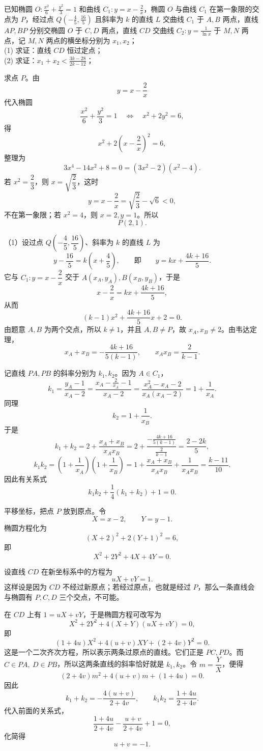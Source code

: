\begin{example}
已知椭圆 $O: \frac{x^2}{6} + \frac{y^2}{3} = 1$ 和曲线 $C_1: y = x - \frac{2}{x}$，椭圆 $O$ 与曲线 $C_1$ 在第一象限的交点为 $P$，经过点 $Q\left(-\frac{4}{5}, \frac{16}{5}\right)$ 且斜率为 $k$ 的直线 $L$ 交曲线 $C_1$ 于 $A,B$ 两点，直线 $AP,BP$ 分别交椭圆 $O$ 于 $C,D$ 两点，直线 $CD$ 交曲线 $C_2: y = \frac{1}{\ln x}$ 于 $M,N$ 两点，记 $M,N$ 两点的横坐标分别为 $x_1,x_2$；\\
(1) 求证：直线 $CD$ 恒过定点；\\
(2) 求证：$x_1 + x_2 < \frac{3k - 28}{2k - 12}$；
\end{example}
\begin{solution}
求点 $P$。由
\[
y=x-\frac{2}{x}
\]
代入椭圆
\[
\frac{x^2}{6}+\frac{y^2}{3}=1
\quad\Longleftrightarrow\quad
x^2+2y^2=6,
\]
得
\[
x^2+2\left(x-\frac{2}{x}\right)^2=6,
\]
整理为
\[
3x^4-14x^2+8=0=(3x^2-2)(x^2-4).
\]
若 $x^2=\dfrac23$，则 $x=\sqrt{\dfrac23}$，这时
\[
y=x-\frac2x=\sqrt{\frac23}-\sqrt6<0,
\]
不在第一象限；若 $x^2=4$，则 $x=2,y=1$。所以
\[
P(2,1).
\]

（1）设过点 $Q\left(-\dfrac45,\dfrac{16}{5}\right)$、斜率为 $k$ 的直线 $L$ 为
\[
y-\frac{16}{5}=k\left(x+\frac45\right),
\qquad\text{即}\qquad
y=kx+\frac{4k+16}{5}.
\]
它与 $C_1:y=x-\dfrac2x$ 交于 $A(x_A,y_A),B(x_B,y_B)$，于是
\[
x-\frac2x=kx+\frac{4k+16}{5},
\]
从而
\[
(k-1)x^2+\frac{4k+16}{5}x+2=0.
\]
由题意 $A,B$ 为两个交点，所以 $k\ne1$，并且 $A,B\ne P$，故 $x_A,x_B\ne2$。由韦达定理，
\[
x_A+x_B=-\frac{4k+16}{5(k-1)},\qquad x_Ax_B=\frac{2}{k-1}.
\]

记直线 $PA,PB$ 的斜率分别为 $k_1,k_2$。因为 $A\in C_1$，
\[
k_1=\frac{y_A-1}{x_A-2}
=\frac{x_A-\frac2{x_A}-1}{x_A-2}
=\frac{x_A^2-x_A-2}{x_A(x_A-2)}
=1+\frac1{x_A}.
\]
同理
\[
k_2=1+\frac1{x_B}.
\]
于是
\[
k_1+k_2
=2+\frac{x_A+x_B}{x_Ax_B}
=2+\frac{-\frac{4k+16}{5(k-1)}}{\frac{2}{k-1}}
=\frac{2-2k}{5},
\]
\[
k_1k_2
=\left(1+\frac1{x_A}\right)\left(1+\frac1{x_B}\right)
=1+\frac{x_A+x_B}{x_Ax_B}+\frac1{x_Ax_B}
=\frac{k-11}{10}.
\]
因此有关系式
\[
k_1k_2+\frac14(k_1+k_2)+1=0.
\]

平移坐标，把点 $P$ 放到原点。令
\[
X=x-2,\qquad Y=y-1.
\]
椭圆方程化为
\[
(X+2)^2+2(Y+1)^2=6,
\]
即
\[
X^2+2Y^2+4X+4Y=0.
\]

设直线 $CD$ 在新坐标系中的方程为
\[
uX+vY=1.
\]
这样设是因为 $CD$ 不经过新原点；若经过原点，也就是经过 $P$，那么一条直线会与椭圆有 $P,C,D$ 三个交点，不可能。

在 $CD$ 上有 $1=uX+vY$，于是椭圆方程可改写为
\[
X^2+2Y^2+4(X+Y)(uX+vY)=0,
\]
即
\[
(1+4u)X^2+4(u+v)XY+(2+4v)Y^2=0.
\]
这是一个二次齐次方程，所以表示两条过原点的直线。它们正是 $PC,PD$。而 $C\in PA,\ D\in PB$，所以这两条直线的斜率恰好就是 $k_1,k_2$。令 $m=\dfrac{Y}{X}$，便得
\[
(2+4v)m^2+4(u+v)m+(1+4u)=0.
\]
因此
\[
k_1+k_2=-\frac{4(u+v)}{2+4v},\qquad
k_1k_2=\frac{1+4u}{2+4v}.
\]
代入前面的关系式，
\[
\frac{1+4u}{2+4v}-\frac{u+v}{2+4v}+1=0,
\]
化简得
\[
u+v=-1.
\]


\end{solution}
